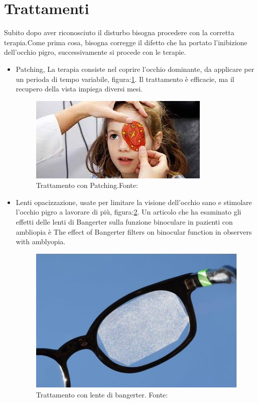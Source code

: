 \documentclass[
a4paper,
cleardoublepage=empty,
headings=twolinechapter,
numbers=autoenddot,
]{scrbook}
\begin{document}
	\section{Trattamenti}
	Subito dopo aver riconosciuto il disturbo bisogna procedere con la corretta terapia.Come prima cosa, bisogna corregge il difetto che ha portato l'inibizione dell'occhio pigro, successivamente si procede con le terapie.
	\begin{itemize}
		\item Patching\cite{patching}, La terapia consiste nel coprire l'occhio dominante, da applicare per un perioda di tempo variabile, figura:\ref{fig:patching}.
		Il trattamento è efficacie, ma il recupero della vista impiega diversi mesi.       	   
			\begin{figure}[H]
				\centering
				\includegraphics[width=0.7\linewidth]{image/patching}
				\caption{Trattamento con Patching.Fonte:\cite{Patching_image}}
				\label{fig:patching}
			\end{figure}	
	
		\item Lenti opacizzazione, usate per limitare la visione dell'occhio sano e stimolare l'occhio pigro a lavorare di più, figura:\ref{fig:penalizzazione-ottica}. Un articolo che ha esaminato gli effetti delle lenti di Bangerter sulla funzione binoculare in pazienti con ambliopia è The effect of Bangerter filters on binocular function in observers with amblyopia\cite{filtro}.
			\begin{figure}[h]
				\centering
				\includegraphics[width=0.5\linewidth]{image/penalizzazione ottica}
				\caption{Trattamento con lente di bangerter.
					Fonte:\cite{Bangerter_image}}
				\label{fig:penalizzazione-ottica}
			\end{figure}
	

\end{itemize}
\end{document}
